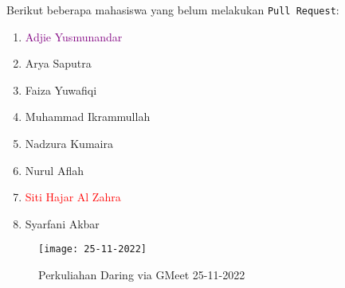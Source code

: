 \documentclass[a4paper]{tufte-handout}
\begin{document}
\noindent
Berikut beberapa mahasiswa yang belum melakukan {\tt Pull Request}:
\begin{multicols}{2}
\begin{enumerate}
\item \textcolor{purple}{Adjie Yusmunandar}
\item Arya Saputra
\item Faiza Yuwafiqi
\item Muhammad Ikrammullah
\item Nadzura Kumaira
\item Nurul Aflah
\item \textcolor{red}{Siti Hajar Al Zahra}
\item Syarfani Akbar
\end{enumerate}
\end{multicols}

\begin{figure}[!ht]
\texttt{[image: 25-11-2022]}
\caption{Perkuliahan Daring via GMeet 25-11-2022}
\label{gam:form-ssh}
\end{figure}

\clearpage
{}

\end{document}
